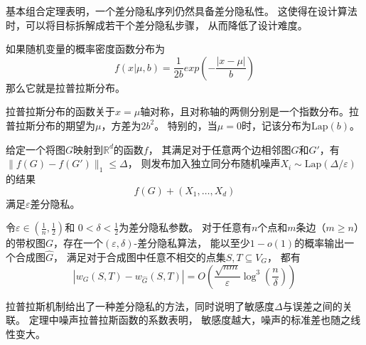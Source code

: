 基本组合定理表明，一个差分隐私序列仍然具备差分隐私性。
这使得在设计算法时，可以将目标拆解成若干个差分隐私步骤，
从而降低了设计难度。

\begin{definition}[拉普拉斯分布]
    如果随机变量的概率密度函数分布为
    \begin{equation}
        f(x|\mu,b)=\frac 1{2b} exp\left(-\frac{|x-\mu|}b\right)
    \end{equation}
    那么它就是拉普拉斯分布。
\end{definition}

拉普拉斯分布的函数关于$x=\mu$轴对称，且对称轴的两侧分别是一个指数分布。拉普拉斯分布的期望为$\mu$，方差为$2b^2$。
特别的，当$\mu=0$时，记该分布为$\text{Lap}(b)$。

\begin{theorem}[拉普拉斯机制]\cite{dwork2014algorithmic}
    \label{laplace}
    给定一个将图$G$映射到$\mathbb{R}^d$的函数$f$，
    其满足对于任意两个边相邻图$G$和$G'$，有$\|f(G)-f(G')\|_1 \leq \Delta$，
    则发布加入独立同分布随机噪声$X_i \sim \text{Lap} (\Delta/\varepsilon)$的结果
    \begin{equation}
        f(G)+(X_1,\ldots,X_d)
    \end{equation}
    满足$\varepsilon$差分隐私。
\end{theorem}

\begin{theorem}[差分隐私图]\cite{liu2024optimal}
    \label{the:dpgraph}
    令$\varepsilon \in \left(\frac{1}{n}, \frac{1}{2}\right) $和 
    $ 0 < \delta < \frac{1}{2} $为差分隐私参数。
    对于任意有$n$个点和$m$条边（$m\geq n$）的带权图$G$，存在一个$(\varepsilon,\delta)$-差分隐私算法，
    能以至少$ 1 - o(1) $的概率输出一个合成图$\hat G$，
    满足对于合成图中任意不相交的点集$ S, T \subseteq V_G $，
    都有
    \begin{equation}
        |w_G(S, T) - w_{\hat{G}}(S, T)| = O\left(\frac{\sqrt{nm}}{\varepsilon} \log^3 \left(\frac{n}{\delta}\right)\right)   
    \end{equation}
    
\end{theorem}

拉普拉斯机制给出了一种差分隐私的方法，同时说明了敏感度$\Delta$与误差之间的关联。
定理中噪声拉普拉斯函数的系数表明，
敏感度越大，噪声的标准差也随之线性变大。

